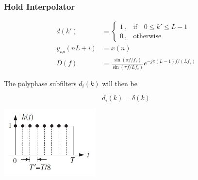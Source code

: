 \subsubsection{Hold Interpolator}
\begin{multicols}{2}
	\begin{align*}
		d(k') &= \begin{cases}
			1\:, & \text{if} \quad 0\leq k' \leq L -1\\
			0\:, & \text{otherwise}
		\end{cases} \\
		y_{up}(nL+i) &= x(n) \\
		D(f) &= \frac{\sin(\pi f/f_s)}{\sin(\pi f/Lf_s)}e^{-j\pi(L-1)f/(Lf_s)}
	\end{align*}
	
	The polyphase subfilters $d_i(k)$ will then be
	
	\begin{equation*}
		d_i(k) = \delta(k)
	\end{equation*}
	
\vfill
\columnbreak
	\begin{center}
		\includegraphics[width=5cm]{images/IntDecOv_Hold.jpg}
	\end{center}	
\vfill
\end{multicols}

